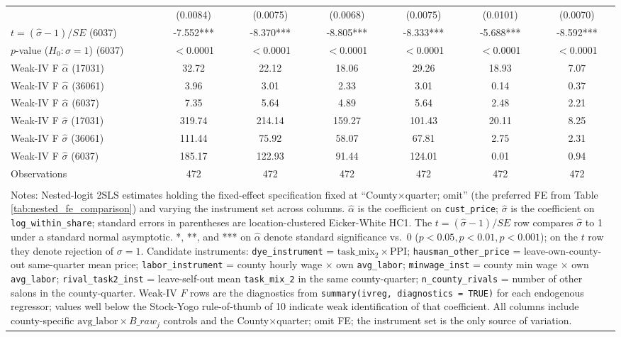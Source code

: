 \begin{table}[!htbp]
\begin{tabular}{lcccccc}
 & (0.0084) & (0.0075) & (0.0068) & (0.0075) & (0.0101) & (0.0070) \\
$t=(\hat\sigma-1)/SE$ (6037) & -7.552*** & -8.370*** & -8.805*** & -8.333*** & -5.688*** & -8.592*** \\
$p$-value ($H_0: \sigma=1$) (6037) & $<$0.0001 & $<$0.0001 & $<$0.0001 & $<$0.0001 & $<$0.0001 & $<$0.0001 \\
Weak-IV F $\hat\alpha$ (17031) & 32.72 & 22.12 & 18.06 & 29.26 & 18.93 & 7.07 \\
Weak-IV F $\hat\alpha$ (36061) & 3.96 & 3.01 & 2.33 & 3.01 & 0.14 & 0.37 \\
Weak-IV F $\hat\alpha$ (6037) & 7.35 & 5.64 & 4.89 & 5.64 & 2.48 & 2.21 \\
Weak-IV F $\hat\sigma$ (17031) & 319.74 & 214.14 & 159.27 & 101.43 & 20.11 & 8.25 \\
Weak-IV F $\hat\sigma$ (36061) & 111.44 & 75.92 & 58.07 & 67.81 & 2.75 & 2.31 \\
Weak-IV F $\hat\sigma$ (6037) & 185.17 & 122.93 & 91.44 & 124.01 & 0.01 & 0.94 \\
Observations & 472 & 472 & 472 & 472 & 472 & 472 \\
\hline \\[-1.8ex]
\multicolumn{7}{p{0.92\linewidth}}{\footnotesize Notes: Nested-logit 2SLS estimates holding the fixed-effect specification fixed at ``County$\times$quarter; omit'' (the preferred FE from Table \ref{tab:nested_fe_comparison}) and varying the instrument set across columns. $\hat\alpha$ is the coefficient on \texttt{cust\_price}; $\hat\sigma$ is the coefficient on \texttt{log\_within\_share}; standard errors in parentheses are location-clustered Eicker-White HC1. The $t = (\hat\sigma - 1)/SE$ row compares $\hat\sigma$ to 1 under a standard normal asymptotic. *, **, and *** on $\hat\alpha$ denote standard significance vs.\ 0 ($p<0.05, p<0.01, p<0.001$); on the $t$ row they denote rejection of $\sigma=1$. Candidate instruments: \texttt{dye\_instrument} = $\text{task\_mix}_2 \times \text{PPI}$; \texttt{hausman\_other\_price} = leave-own-county-out same-quarter mean price; \texttt{labor\_instrument} = county hourly wage $\times$ own \texttt{avg\_labor}; \texttt{minwage\_inst} = county min wage $\times$ own \texttt{avg\_labor}; \texttt{rival\_task2\_inst} = leave-self-out mean \texttt{task\_mix\_2} in the same county-quarter; \texttt{n\_county\_rivals} = number of other salons in the county-quarter. Weak-IV $F$ rows are the diagnostics from \texttt{summary(ivreg, diagnostics = TRUE)} for each endogenous regressor; values well below the Stock-Yogo rule-of-thumb of 10 indicate weak identification of that coefficient. All columns include county-specific $\text{avg\_labor} \times B\_raw_j$ controls and the County$\times$quarter; omit FE; the instrument set is the only source of variation.}\\
\end{tabular}
\end{table}
